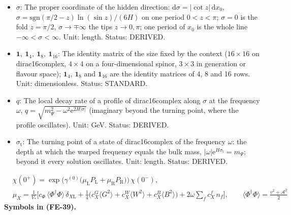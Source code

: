 \documentclass[
  10pt,
]{article}
\begin{document}
\begin{itemize}
  in the bulk. Unit: GeV (1/length). Value: \(H > 2534\) GeV, about 2.5
  TeV (from the invisible width of the Z boson). Status: AUTHOR.
\item
  \(\sigma\): The proper coordinate of the hidden direction:
  \(\mathrm{d}\sigma = \lvert\cot z\rvert\,\mathrm{d}x_0\),
  \(\sigma = \mathrm{sgn}(\pi/2 - z)\ln(\sin z)/(6H)\) on one period
  \(0 < z < \pi\); \(\sigma = 0\) is the fold \(z = \pi/2\),
  \(\sigma \to \mp\infty\) the tips \(z \to 0, \pi\); one period of
  \(x_0\) is the whole line \(-\infty < \sigma < \infty\). Unit: length.
  Status: DERIVED.
\item
  \(\mathbf{1},\ \mathbf{1}_4,\ \mathbf{1}_8,\ \mathbf{1}_{16}\): The
  identity matrix of the size fixed by the context (\(16 \times 16\) on
  dirac16complex, \(4 \times 4\) on a four-dimensional spinor,
  \(3 \times 3\) in generation or flavour space); \(\mathbf{1}_4\),
  \(\mathbf{1}_8\) and \(\mathbf{1}_{16}\) are the identity matrices of
  4, 8 and 16 rows. Unit: dimensionless. Status: STANDARD.
\item
  \(q\): The local decay rate of a profile of dirac16complex along
  \(\sigma\) at the frequency \(\omega\),
  \(q = \sqrt{m_\Psi^2 - \omega^2\mathrm{e}^{2H\lvert\sigma\rvert}}\)
  (imaginary beyond the turning point, where the profile oscillates).
  Unit: GeV. Status: DERIVED.
\item
  \(\sigma_{\mathrm{t}}\): The turning point of a state of
  dirac16complex of the frequency \(\omega\): the depth at which the
  warped frequency equals the bulk mass,
  \(\lvert\omega\rvert\mathrm{e}^{H\sigma_{\mathrm{t}}} = m_\Psi\);
  beyond it every solution oscillates. Unit: length. Status: DERIVED.
\end{itemize}

\[
\begin{aligned}
&\chi(0^+) = \exp\Big(\gamma^{(0)}\big(\mu_{\mathrm{L}}P_{\mathrm{L}} + \mu_{\mathrm{R}}P_{\mathrm{R}}\big)\Big)\,\chi(0^-),\\
&\mu_X = \frac{1}{V_*}\Big[c_\Phi\,\langle\Phi^\dagger\Phi\rangle\,\delta_{X\mathrm{L}} + \frac14\big(c^{G}_X\langle G^2\rangle
 + c^{W}_X\langle W^2\rangle + c^{B}_X\langle B^2\rangle\big) + 2\omega\sum_f c^{f}_X\,n_f\Big],\qquad
 \langle\Phi^\dagger\Phi\rangle = \frac{v^2 + \mathcal{A}^2}{2}
\end{aligned} \tag{FE-39}
\] \textbf{Symbols in (FE-39).}
\end{document}
